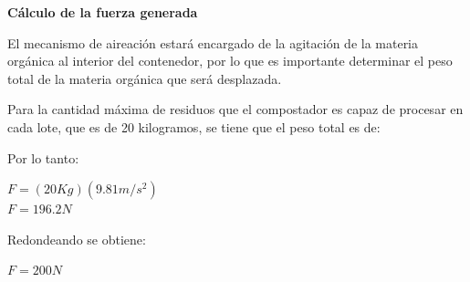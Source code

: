 \textbf{Cálculo de la fuerza generada}

El mecanismo de aireación estará encargado de la agitación de la materia orgánica al interior del contenedor, por lo que es importante determinar el peso total de la materia orgánica que será desplazada.

 Para la cantidad máxima de residuos que el compostador es capaz de procesar en cada lote, que es de 20 kilogramos, se tiene que el peso total es de:

  Por lo tanto:
\begin{center}
    $F = (20 Kg)(9.81 m/s^2)$ \\
    $F = 196.2 N $
\end{center}
Redondeando se obtiene:

 \begin{center}
     $F = 200 N $
 \end{center}


